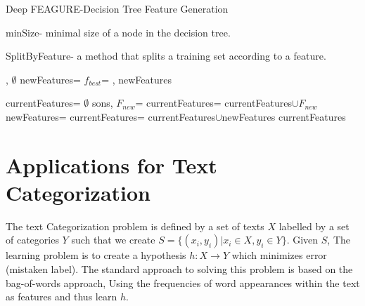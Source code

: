 \documentclass[twoside,11pt]{article}
\theoremstyle{definition}
\begin{document}
\begin{algorithm}[H]
	\caption{Deep FEAGURE-Decision Tree Feature Generation}
	\label{code-tree-thing}
	\small
		minSize- minimal size of a node in the decision tree.

        SplitByFeature- a method that splits a training set according to a feature.
        
		\begin{algorithmic}
                    \State
                    \Return {}, $\emptyset$
                \EndIf
                \State newFeatures=
                \State $f_{best}$=
                \State \Return {}, newFeatures
			\EndFunction

            			
			\State 
                \State currentFeatures= $\emptyset$
                \State sons, $F_{new}$=
                \State currentFeatures= currentFeatures$\cup F_{new}$
                    \State newFeatures=
                    \State currentFeatures= currentFeatures$\cup$newFeatures
                \EndFor
                \State \Return currentFeatures
			\EndFunction
		\end{algorithmic}
	\end{algorithm}

\section{Applications for Text Categorization}

The text Categorization problem is defined by a set of texts $X$ labelled by a set of categories $Y$ such that we create $S=\{(x_i,y_i)|x_i\in X, y_i\in Y\}$. Given $S$, The learning problem is to create a hypothesis $h:X\rightarrow Y$ which minimizes error (mistaken label).
The standard approach to solving this problem is based on the bag-of-words \cite{Wu:1981:CST:1013228.511759,salton1983introduction} approach, Using the frequencies of word appearances within the text as features and thus learn $h$.
\end{document}
